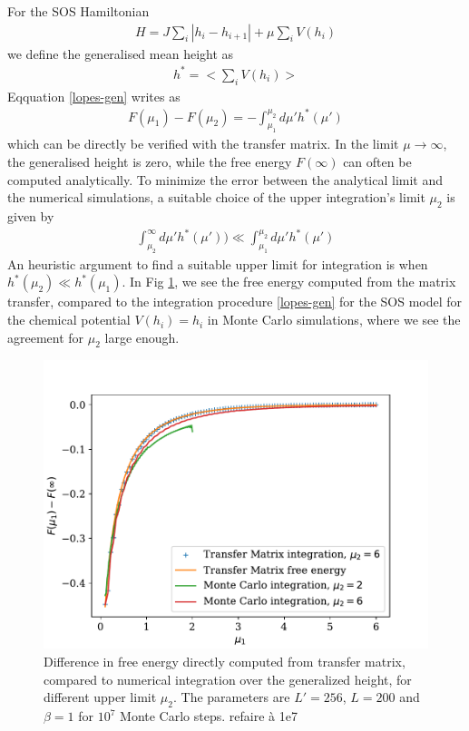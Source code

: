 {For the SOS Hamiltonian
\begin{align}
    H =  J \sum_i |h_i -h_{i+1}|  + \mu \sum_i V(h_i)
\end{align}
we define the generalised mean height as
\begin{align}
    h^\ast = < \sum_i V(h_i) >
\end{align}
Eqquation \eqref{lopes-gen} writes as
\begin{align}
   F(\mu_1) - F(\mu_2) = -  \int_{\mu_1}^{\mu_2} d\mu' h^\ast(\mu')
   \label{diff-gene}
\end{align}
which can be directly be verified with the transfer matrix. 
In the limit $\mu \to \infty$, the generalised height is zero, while the free energy $F(\infty)$ can often be computed analytically. 
To minimize the error between the analytical limit and the numerical simulations, a suitable choice of the upper integration's limit $\mu_2$ is given by
\begin{align}
    \int_{\mu_2}^\infty  d\mu' h^\ast(\mu')) \ll \int_{\mu_1}^{\mu_2}  d\mu' h^\ast(\mu')
\end{align}
An heuristic argument to find a suitable upper limit for integration is when $h^\ast(\mu_2) \ll h^\ast(\mu_1)$.
In Fig \ref{integration-free-ene}, we see the free energy computed from the matrix transfer, compared to the integration procedure \eqref{lopes-gen} for the SOS model for the chemical potential $V(h_i)=h_i$ in Monte Carlo simulations, where we see the agreement for $\mu_2$ large enough.

\begin{figure}
    \centering
    \includegraphics[width=0.7\linewidth]{int-dyn/integration-free-ene.pdf}
    \caption{Difference in free energy directly computed from transfer matrix, compared to numerical integration over the generalized height, for different upper limit $\mu_2$. The parameters are $L' = 256$, $L=200$ and $\beta=1$ for $10^7$ Monte Carlo steps.
    {\color{red} refaire à 1e7}}
    \label{integration-free-ene}
\end{figure}

}
